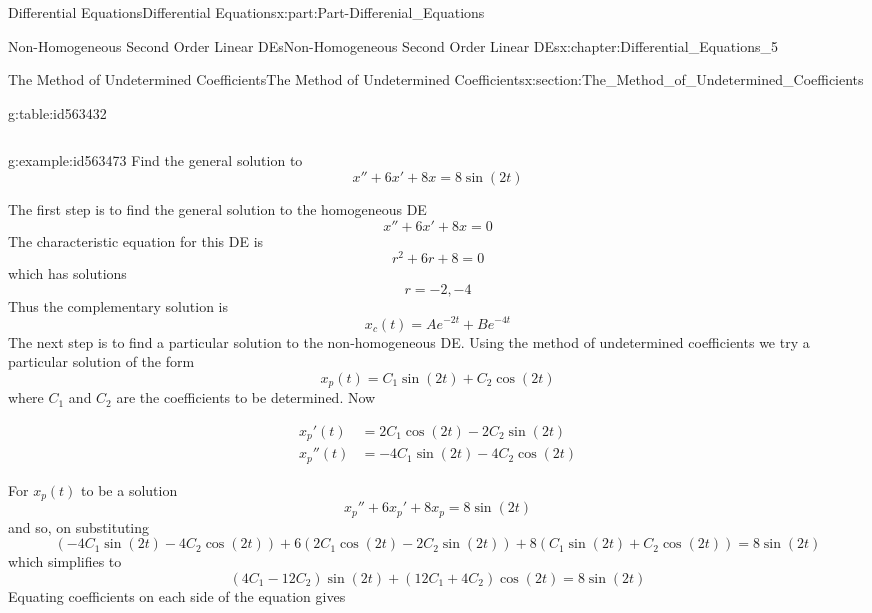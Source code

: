 \documentclass[oneside,10pt,]{book}
\numberwithin{equation}{section}
\newcommand{\amp}{&}
\begin{document}
\begin{partptx}{Differential Equations}{}{Differential Equations}{}{}{x:part:Part-Differenial_Equations}
\begin{chapterptx}{Non-Homogeneous Second Order Linear DEs}{}{Non-Homogeneous Second Order Linear DEs}{}{}{x:chapter:Differential_Equations_5}
\begin{sectionptx}{The Method of Undetermined Coefficients}{}{The Method of Undetermined Coefficients}{}{}{x:section:The_Method_of_Undetermined_Coefficients}
\begin{tableptx}{\textbf{}}{g:table:id563432}{}
{\begin{tabular}{cc}
\end{tabular}
}%
\end{tableptx}%
%
\begin{example}{}{g:example:id563473}%
Find the general solution to%
\begin{equation*}
x''+6x'+8x=8\sin(2t)
\end{equation*}
%
\par\smallskip%
\noindent\hypertarget{g:solution:id563515}{}The first step is to find the general solution to the homogeneous DE%
\begin{equation*}
x''+6x'+8x=0
\end{equation*}
The characteristic equation for this DE is%
\begin{equation*}
r^2+6r+8=0
\end{equation*}
which has solutions%
\begin{equation*}
r=-2, -4
\end{equation*}
Thus the complementary solution is%
\begin{equation*}
x_c(t)=Ae^{-2t}+Be^{-4t}
\end{equation*}
The next step is to find a particular solution to the non-homogeneous DE. Using the method of undetermined coefficients we try a particular solution of the form%
\begin{equation*}
x_p(t)=C_1\sin(2t)+C_2\cos(2t)
\end{equation*}
where \(C_1\) and \(C_2\) are the coefficients to be determined. Now%
\par
%
\begin{align*}
x_p'(t) \amp = 2C_1\cos(2t)-2C_2\sin(2t)\\
x_p''(t) \amp = -4C_1\sin(2t)-4C_2\cos(2t)
\end{align*}
%
\par
For \(x_p(t)\) to be a solution%
\begin{equation*}
x_p''+6x_p'+8x_p=8\sin(2t)
\end{equation*}
and so, on substituting%
\begin{equation*}
(-4C_1\sin(2t)-4C_2\cos(2t))+6(2C_1\cos(2t)-2C_2\sin(2t))+8(C_1\sin(2t)+C_2\cos(2t)) = 8\sin(2t)
\end{equation*}
which simplifies to%
\begin{equation*}
(4C_1-12C_2)\sin(2t)+(12C_1+4C_2)\cos(2t) = 8\sin(2t)
\end{equation*}
Equating coefficients on each side of the equation gives%
\par
%
\begin{align*}

\end{align*}
\end{example}
\end{sectionptx}
\end{chapterptx}
\end{partptx}
\end{document}
